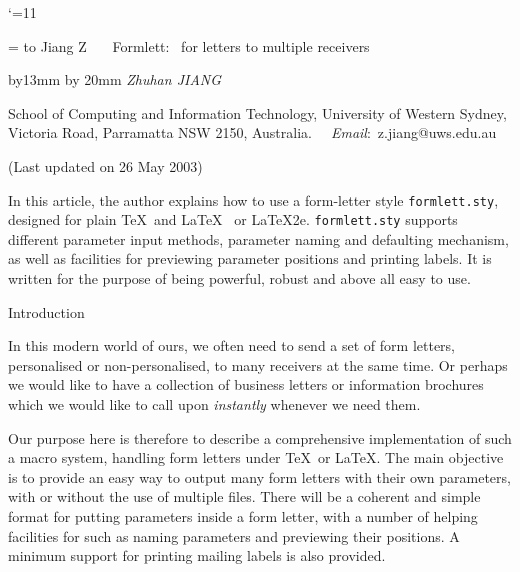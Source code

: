 {%
%
%



\catcode`\@=11\relax
{}
\voffset=-0.3in


\ifx\pageno\undefined
{}
\fi


\parindent=0pt
\hsize=469.75499pt  %
\vsize=9.6in %

\def\makefootline{\baselineskip=24pt \line{\the\footline}}
\footline={
\hbox to \hsize
 {{\tenrm Jiang Z ~~~{\tensl Formlett: ~for letters to multiple receivers}
\hss \folio}}}

\bigskip


{\advance\leftskip by13mm \overfullrule=0pt
\advance\rightskip by 20mm %
\sl
\noindent Zhuhan JIANG\par
\noindent School of Computing and Information Technology,
 University of Western Sydney, Victoria Road, Parramatta NSW 2150, Australia.
{\sl ~~Email}:~z.jiang@uws.edu.au\par
\medskip
\rm\smooth
\noindent (Last updated on 26 May 2003)\par
\medskip

\noindent
In this article, the author explains how to use a form-letter
style {\tt formlett.sty}, designed for plain \TeX\ and \LaTeX
\ or \LaTeX2e. {\tt formlett.sty} supports different parameter input
methods, parameter naming and defaulting mechanism, as well as
facilities for previewing parameter positions and printing
labels. It is written for the purpose of being powerful, robust
and above all easy to use.\par }


\begincolumns

{\lbold Introduction}

\smallskip

In this modern world of ours, we often need to send a set of form
letters, personalised or non-personalised, to many receivers at
the same time. Or perhaps we would like to have a collection of
business letters or information brochures which we would like to
call upon {\sl instantly} whenever we need them.

\medskip

Our purpose here is therefore to describe a comprehensive
implementation of such a macro system, handling form letters
under \TeX\ or \LaTeX. The main objective is to provide an easy
way to output many form letters with  their own parameters, with
or without the use of multiple files. There will be a coherent
and simple format for putting parameters inside a form letter,
with a number of helping facilities for such as naming parameters
and previewing their positions. A minimum support for printing
mailing labels is also provided.


}
